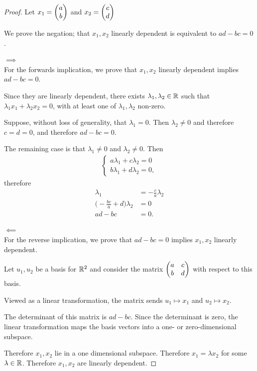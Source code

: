 \documentclass[12pt]{article}
\begin{document}
\newpage

\begin{proof}
Let $x_1 = \begin{pmatrix}a\\b\end{pmatrix}$ and $x_2 = \begin{pmatrix}c\\d\end{pmatrix}$

We prove the negation; that $x_1, x_2$ linearly dependent is equivalent to
$ad - bc = 0$.

$\implies$\\
For the forwards implication, we prove that $x_1, x_2$ linearly dependent
implies $ad - bc = 0$.

Since they are linearly dependent, there exists $\lambda_1, \lambda_2 \in \mathbb{R}$
such that $\lambda_1x_1 + \lambda_2x_2 = 0$, with at least one of
$\lambda_1, \lambda_2$ non-zero.

Suppose, without loss of generality, that $\lambda_1 = 0$. Then
$\lambda_2 \neq 0$ and therefore $c = d = 0$, and therefore $ad - bc = 0$.

The remaining case is that $\lambda_1 \neq 0$ and $\lambda_2 \neq 0$. Then
\begin{align*}
  \begin{cases}
    a\lambda_1 + c\lambda_2 = 0\\
    b\lambda_1 + d\lambda_2 = 0,
  \end{cases}
\end{align*}
therefore
\begin{align*}
  \lambda_1                            &= -\frac{c}{a}\lambda_2\\
  \Big(-\frac{bc}{a} + d\Big)\lambda_2 &= 0\\
  ad - bc                              &= 0.
\end{align*}

$\impliedby$\\
For the reverse implication, we prove that $ad - bc = 0$ implies $x_1, x_2$
linearly dependent.


Let $u_1, u_2$ be a basis for $\mathbb{R}^2$ and consider the matrix
$\begin{pmatrix}a & c\\b & d\\ \end{pmatrix}$ with respect to this basis.

Viewed as a linear transformation, the matrix sends $u_1 \mapsto x_1$ and
$u_2 \mapsto x_2$.

The determinant of this matrix is $ad - bc$. Since the determinant is zero, the
linear transformation maps the basis vectors into a one- or zero-dimensional
subspace.

Therefore $x_1,x_2$ lie in a one dimensional subspace. Therefore
$x_1 = \lambda x_2$ for some $\lambda \in \mathbb{R}$. Therefore $x_1,x_2$ are linearly
dependent.

\end{proof}
\end{document}
